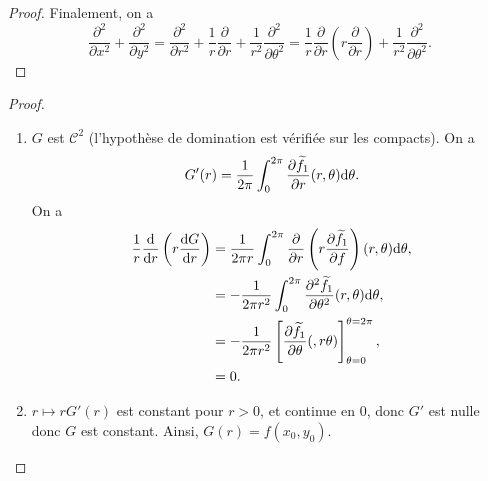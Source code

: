 \documentclass[12pt]{article}
\begin{document}
\begin{proof}
	Finalement, on a 
	\begin{equation}
		\frac{\partial^{2}}{\partial x^{2}}+\frac{\partial^{2}}{\partial y^{2}}=\frac{\partial^{2}}{\partial r^{2}}+\frac{1}{r}\frac{\partial}{\partial r}+\frac{1}{r^{2}}\frac{\partial^{2}}{\partial\theta^{2}}=\frac{1}{r}\frac{\partial}{\partial r}\left(r\frac{\partial}{\partial r}\right)+\frac{1}{r^{2}}\frac{\partial^{2}}{\partial\theta^{2}}.
	\end{equation}
\end{proof}

\begin{proof}
	\phantom{}
	\begin{enumerate}
		\item $G$ est $\mathcal{C}^{2}$ (l'hypothèse de domination est vérifiée sur les compacts). On a 
		\begin{equation}
			G'(r)=\frac{1}{2\pi}\int_{0}^{2\pi}\frac{\partial\widetilde{f}_1}{\partial r}(r,\theta)\mathrm{d}\theta.
		\end{equation}
		On a 
		\begin{align}
			\frac{1}{r}\frac{\mathrm{d}}{\mathrm{d} r}\left(r\frac{\mathrm{d} G}{\mathrm{d} r}\right)
			&=\frac{1}{2\pi r}\int_{0}^{2\pi}\frac{\partial}{\partial r}\left(r\frac{\partial \widetilde{f}_1}{\partial f}\right)(r,\theta)\mathrm{d}\theta,\\
			&=-\frac{1}{2\pi r^{2}}\int_{0}^{2\pi}\frac{\partial^{2}\widetilde{f}_1}{\partial\theta^{2}}(r,\theta)\mathrm{d}\theta,\\
			&=-\frac{1}{2\pi r^{2}}\left[\frac{\partial \widetilde{f}_1}{\partial\theta}(,r\theta)\right]_{\theta=0}^{\theta=2\pi},\\
			&=0.
		\end{align}
		\item 
		$r\mapsto rG'(r)$ est constant pour $r>0$, et continue en $0$, donc $G'$ est nulle donc $G$ est constant. Ainsi, $G(r)=f(x_0,y_0)$.
	\end{enumerate}
\end{proof}
\end{document}
